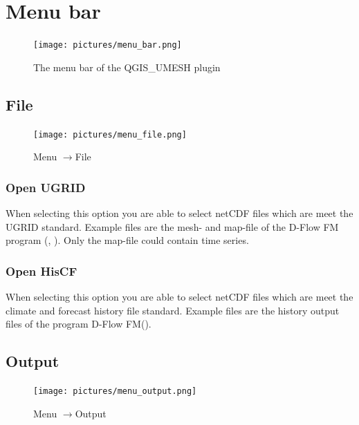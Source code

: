 \documentclass{deltares_memo}
\newcommand{\menuarrow}{$\rightarrow$}
\newcommand{\dflowfm}{D-Flow FM\xspace}
\newcommand{\qumesh}{QGIS\_UMESH\xspace}
\newcommand{\netcdf}{netCDF\xspace}
\begin{document}
\section{Menu bar}
\phantom{m}\vspace{-\baselineskip}
\begin{figure}[H]
    \centering
    \texttt{[image: pictures/menu\_bar.png]}
    \caption{The menu bar of the \qumesh plugin}
\end{figure}

\subsection{File}
\phantom{m}\vspace{-\baselineskip}
\begin{figure}[H]
    \centering
    \texttt{[image: pictures/menu\_file.png]}
    \caption{Menu \menuarrow File}
\end{figure}

\subsubsection{Open UGRID}
When selecting this option you are able to select \netcdf files which are meet the UGRID standard.
Example files are the mesh- and map-file of the \dflowfm program (, ).
Only the map-file could contain time series.
\subsubsection{Open HisCF}
When selecting this option you are able to select \netcdf files which are meet the climate and forecast history file standard.
Example files are the history output files of the program \dflowfm ().
\subsection{Output}
\phantom{m}\vspace{-\baselineskip}
\begin{figure}[H]
    \centering
    \texttt{[image: pictures/menu\_output.png]}
    \caption{Menu \menuarrow Output}
\end{figure}
\end{document}
